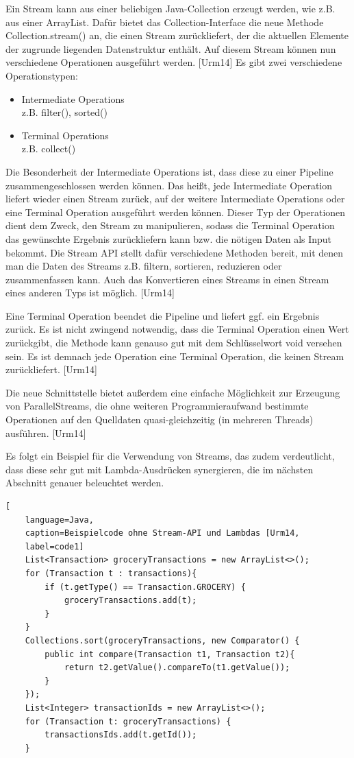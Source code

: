 Ein Stream kann aus einer beliebigen Java-Collection erzeugt werden, wie z.B. aus einer ArrayList. Dafür bietet das Collection-Interface die neue Methode Collection.stream() an, die einen Stream zurückliefert, der die aktuellen Elemente der zugrunde liegenden Datenstruktur enthält. Auf diesem Stream können nun verschiedene Operationen ausgeführt werden. [Urm14] Es gibt zwei verschiedene Operationstypen:
\begin{itemize}
	\item Intermediate Operations \\z.B. filter(), sorted()
	\item Terminal Operations \\ z.B. collect()
\end{itemize}

Die Besonderheit der Intermediate Operations ist, dass diese zu einer Pipeline zusammengeschlossen werden können. Das heißt, jede Intermediate Operation liefert wieder einen Stream zurück, auf der weitere Intermediate Operations oder eine Terminal Operation ausgeführt werden können. Dieser Typ der Operationen dient dem Zweck, den Stream zu manipulieren, sodass die Terminal Operation das gewünschte Ergebnis zurückliefern kann bzw. die nötigen Daten als Input bekommt. Die Stream API stellt dafür verschiedene Methoden bereit, mit denen man die Daten des Streams z.B. filtern, sortieren, reduzieren oder zusammenfassen kann. Auch das Konvertieren eines Streams in einen Stream eines anderen Typs ist möglich. [Urm14]

Eine Terminal Operation beendet die Pipeline und liefert ggf. ein Ergebnis zurück. Es ist nicht zwingend notwendig, dass die Terminal Operation einen Wert zurückgibt, die Methode kann genauso gut mit dem Schlüsselwort void versehen sein. Es ist demnach jede Operation eine Terminal Operation, die keinen Stream zurückliefert. [Urm14]

Die neue Schnittstelle bietet außerdem eine einfache Möglichkeit zur Erzeugung von ParallelStreams, die ohne weiteren Programmieraufwand bestimmte Operationen auf den Quelldaten quasi-gleichzeitig (in mehreren Threads) ausführen. [Urm14]

Es folgt ein Beispiel für die Verwendung von Streams, das zudem verdeutlicht, dass diese sehr gut mit Lambda-Ausdrücken synergieren, die im nächsten Abschnitt genauer beleuchtet werden.

\begin{lstlisting}[
    language=Java,
    caption=Beispielcode ohne Stream-API und Lambdas [Urm14,
    label=code1]
	List<Transaction> groceryTransactions = new ArrayList<>();
	for (Transaction t : transactions){
		if (t.getType() == Transaction.GROCERY) {
			groceryTransactions.add(t);
  		}
	}
	Collections.sort(groceryTransactions, new Comparator() {
 		public int compare(Transaction t1, Transaction t2){
			return t2.getValue().compareTo(t1.getValue());
		}
	});
	List<Integer> transactionIds = new ArrayList<>();
	for (Transaction t: groceryTransactions) {
		transactionsIds.add(t.getId());
	}
\end{lstlisting}  

